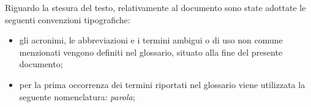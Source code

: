 Riguardo la stesura del testo, relativamente al documento sono state adottate le seguenti convenzioni tipografiche:
\begin{itemize}
	\item gli acronimi, le abbreviazioni e i termini ambigui o di uso non comune menzionati vengono definiti nel glossario, situato alla fine del presente documento;
	\item per la prima occorrenza dei termini riportati nel glossario viene utilizzata la seguente nomenclatura: \emph{parola}\glsfirstoccur;
\end{itemize}
